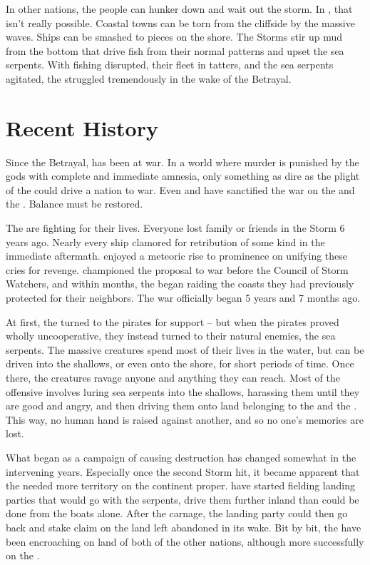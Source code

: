 \documentclass[blue]{GL2020}
\begin{document}
In other nations, the people can hunker down and wait out the storm. In \pShip{}, that isn't really possible. Coastal towns can be torn from the cliffside by the massive waves. Ships can be smashed to pieces on the shore. The Storms stir up mud from the bottom that drive fish from their normal patterns and upset the sea serpents. With fishing disrupted, their fleet in tatters, and the sea serpents agitated, the \pShip{} struggled tremendously in the wake of the Betrayal.

\section*{Recent History}
Since the Betrayal, \pEarth{} has been at war. In a world where murder is punished by the gods with complete and immediate amnesia, only something as dire as the plight of the \pShippies{} could drive a nation to war. Even \cEbbFull{} and \cFlowFull{} have sanctified the war on the \pFarm{} and the \pTech{}. Balance must be restored.

The \pShip{} are fighting for their lives. Everyone lost family or friends in the Storm 6 years ago. Nearly every ship clamored for retribution of some kind in the immediate aftermath. \cLoud{\full} enjoyed a meteoric rise to prominence on unifying these cries for revenge. \cLoud{\They} championed the proposal to war before the Council of Storm Watchers, and within months, the \pShip{} began raiding the coasts they had previously protected for their neighbors. The war officially began 5 years and 7 months ago. 

At first, the \pShippies{} turned to the pirates for support -- but when the pirates proved wholly uncooperative, they instead turned to their natural enemies, the sea serpents. The massive creatures spend most of their lives in the water, but can be driven into the shallows, or even onto the shore, for short periods of time. Once there, the creatures ravage anyone and anything they can reach. Most of the \pShip{} offensive involves luring sea serpents into the shallows, harassing them until they are good and angry, and then driving them onto land belonging to the \pFarm{} and the \pTech{}. This way, no human hand is raised against another, and so no one's memories are lost.

What began as a campaign of causing destruction has changed somewhat in the intervening years. Especially once the second Storm hit, it became apparent that the \pShip{} needed more territory on the continent proper. \pShippies{} have started fielding landing parties that would go with the serpents, drive them further inland than could be done from the boats alone. After the carnage, the landing party could then go back and stake claim on the land left abandoned in its wake. Bit by bit, the \pShip{} have been encroaching on land of both of the other nations, although more successfully on the \pFarm{}.
\end{document}
